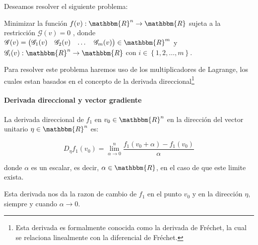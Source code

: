             Deseamos resolver el siguiente problema:

            Minimizar la función
            $f(v):\mathbbm{R}^n \to \mathbbm{R}$
            sujeta a la restricción $\mathscr{G}(v) = 0$
            , donde $\mathscr{G}(v)=\begin{pmatrix}\mathscr{G}_1(v) & \mathscr{G}_2(v) & \dots & \mathscr{G}_m(v) \end{pmatrix} \in \mathbbm{R}^m$
             y $\mathscr{G}_i(v): \mathbbm{R}^n \to \mathbbm{R}$
             con $i \in \left\{ 1, 2, \dots, m \right\}$.

            Para resolver este problema haremos uso de los multiplicadores de Lagrange, los cuales estan basados en el concepto de la derivada direccional\footnote{Esta derivada es formalmente conocida como la derivada de Fréchet, la cual se relaciona linealmente con la diferencial de Fréchet.}

            \paragraph{Derivada direccional y vector gradiente}

                \begin{definicion}
                    La derivada direccional de $f_1$ en $v_0 \in \mathbbm{R}^n$ en la dirección del vector unitario $\eta \in \mathbbm{R}^n$ es:

                    \begin{equation}
                        D_{\eta} f_1(v_0) = \lim_{\alpha \to 0}^{n}  \frac{f_1(v_0 + \alpha) - f_1(v_0)}{\alpha}
                    \end{equation}

                    donde $\alpha$ es un escalar, es decir, $\alpha \in \mathbbm{R}$, en el caso de que este limite exista.



                    Esta derivada nos da la razon de cambio de $f_1$ en el punto $v_0$ y en la dirección $\eta$, siempre y cuando $\alpha \to 0$.
                \end{definicion}

